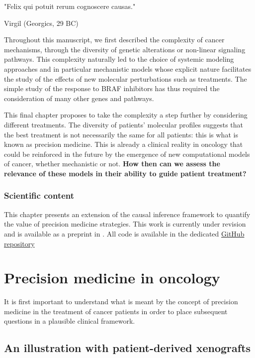 \documentclass[a4paper,12pt,twoside,onecolumn,openright,final,oldfontcommands]{memoir}
\newcommand{\initial}[1]{
	\lettrine[lines=3,lhang=0.33,nindent=0em]{
		\color{gray}
     		{\textsc{#1}}}{}}
\let\BeginKnitrBlock\begin \let\EndKnitrBlock\end
\begin{document}
\epigraph{"Felix qui potuit rerum cognoscere causas."}{Virgil (Georgics, 29 BC)}

\initial{T}hroughout this manuscript, we first described the complexity
of cancer mechanisms, through the diversity of genetic alterations or
non-linear signaling pathways. This complexity naturally led to the
choice of systemic modeling approaches and in particular mechanistic
models whose explicit nature facilitates the study of the effects of new
molecular perturbations such as treatments. The simple study of the
response to BRAF inhibitors has thus required the consideration of many
other genes and pathways.

This final chapter proposes to take the complexity a step further by
considering different treatments. The diversity of patients' molecular
profiles suggests that the best treatment is not necessarily the same
for all patients: this is what is known as precision medicine. This is
already a clinical reality in oncology that could be reinforced in the
future by the emergence of new computational models of cancer, whether
mechanistic or not. \textbf{How then can we assess the relevance of
these models in their ability to guide patient treatment?}

\BeginKnitrBlock{summarybox}
\subsubsection*{Scientific content}\label{scientific-content-6}

This chapter presents an extension of the causal inference framework to
quantify the value of precision medicine strategies. This work is
currently under revision and is available as a preprint in
\citet{beal2020causal}. All code is available in the dedicated
\href{https://github.com/JonasBeal/Causal_Precision_Medicine}{GitHub
repository}
\EndKnitrBlock{summarybox}

\section{Precision medicine in
oncology}\label{precision-medicine-in-oncology}

It is first important to understand what is meant by the concept of
precision medicine in the treatment of cancer patients in order to place
subsequent questions in a plausible clinical framework.

\subsection{An illustration with patient-derived
xenografts}\label{main-PDX}
\end{document}
